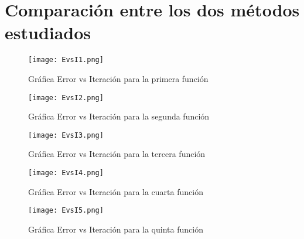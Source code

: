 \documentclass{article}
\begin{document}
\section{Comparación entre los dos métodos estudiados}
\begin{figure}[H]
    \centering
    \texttt{[image: EvsI1.png]}
    \caption{Gráfica Error vs Iteración para la primera función}
    \label{fig:EvsI1}
\end{figure}
\begin{figure}[H]
    \centering
    \texttt{[image: EvsI2.png]}
    \caption{Gráfica Error vs Iteración para la segunda función}
    \label{fig:EvsI2}
\end{figure}
\begin{figure}[H]
    \centering
    \texttt{[image: EvsI3.png]}
    \caption{Gráfica Error vs Iteración para la tercera función}
    \label{fig:EvsI3}
\end{figure}
\begin{figure}[H]
    \centering
    \texttt{[image: EvsI4.png]}
    \caption{Gráfica Error vs Iteración para la cuarta función}
    \label{fig:EvsI4}
\end{figure}
\begin{figure}[H]
    \centering
    \texttt{[image: EvsI5.png]}
    \caption{Gráfica Error vs Iteración para la quinta función}
    \label{fig:EvsI5}
\end{figure}
\end{document}
